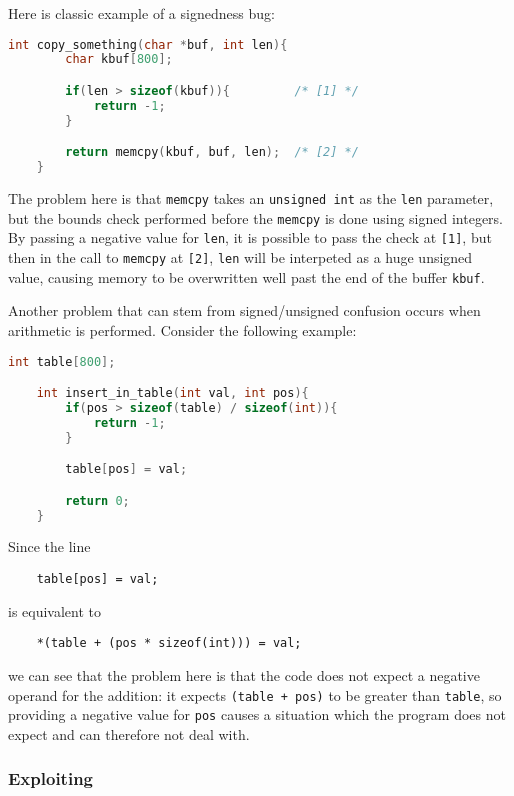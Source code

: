 \documentclass{iacrtrans}
\begin{document}
Here is classic example of a signedness bug:

\begin{lstlisting}[language=c]
    int copy_something(char *buf, int len){
        char kbuf[800];

        if(len > sizeof(kbuf)){         /* [1] */
            return -1;
        }

        return memcpy(kbuf, buf, len);  /* [2] */
    }
\end{lstlisting}

The problem here is that \texttt{memcpy} takes an \texttt{unsigned int} as the \texttt{len} parameter,
but the bounds check performed before the \texttt{memcpy} is done using signed
integers.  By passing a negative value for \texttt{len}, it is possible to pass the
check at \texttt{[1]}, but then in the call to \texttt{memcpy} at \texttt{[2]}, \texttt{len} will be interpeted
as a huge unsigned value, causing memory to be overwritten well past the
end of the buffer \texttt{kbuf}.

Another problem that can stem from signed/unsigned confusion occurs when
arithmetic is performed.  Consider the following example:

\begin{lstlisting}[language=c]
    int table[800];

    int insert_in_table(int val, int pos){
        if(pos > sizeof(table) / sizeof(int)){
            return -1;
        }

        table[pos] = val;

        return 0;
    }
\end{lstlisting}

Since the line
\begin{verbatim}
    table[pos] = val;
\end{verbatim}
is equivalent to
\begin{verbatim}
    *(table + (pos * sizeof(int))) = val;
\end{verbatim}
we can see that the problem here is that the code does not expect a
negative operand for the addition: it expects \texttt{(table + pos)} to be greater
than \texttt{table}, so providing a negative value for \texttt{pos} causes a situation which
the program does not expect and can therefore not deal with.

\subsubsection{Exploiting}
\end{document}
